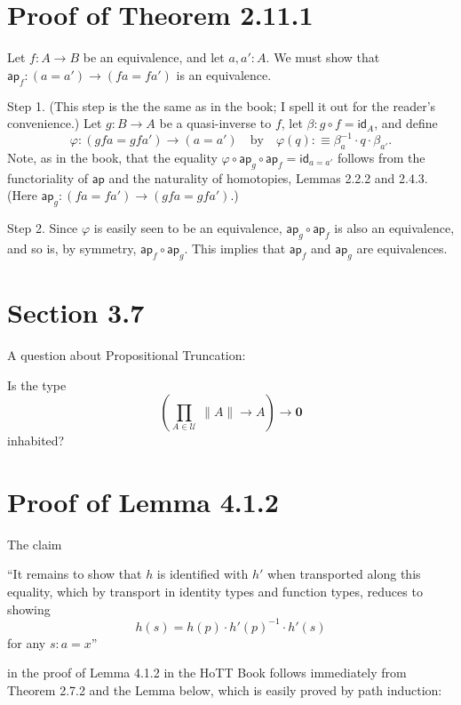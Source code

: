 \documentclass[12pt]{article}
\newcommand{\nn}{\noindent}
\newcommand{\ap}{\mathsf{ap}}
\newcommand{\id}{\mathsf{id}}
\begin{document}

\section{Proof of Theorem 2.11.1}

Let $f:A\to B$ be an equivalence, and let $a,a':A$. We must show that $\ap_f:(a=a')\to (fa=fa')$ is an equivalence.

Step 1. (This step is the the same as in the book; I spell it out for the reader's convenience.) Let $g:B\to A$ be a quasi-inverse to $f$, let $\beta:g\circ f=\id_A$, and define 
$$
\varphi:(gfa=gfa')\to(a=a')\quad\text{by}\quad\varphi(q):\equiv\beta_a^{-1}\cdot q\cdot\beta_{a'}.
$$ 
Note, as in the book, that the equality $\varphi\circ\ap_g\circ\ap_f=\id_{a=a'}$ follows from the functoriality of $\ap$ and the naturality of homotopies, Lemmas 2.2.2 and 2.4.3. (Here $\ap_g:(fa=fa')\to (gfa=gfa')$.)

Step 2. Since $\varphi$ is easily seen to be an equivalence, $\ap_g\circ\ap_f$ is also an equivalence, and so is, by symmetry, $\ap_f\circ\ap_g$. This implies that $\ap_f$ and $\ap_g$ are equivalences.



\section{Section 3.7}

A question about Propositional Truncation:

Is the type 
$$
\left(\prod_{A\in\mathcal U}\ \lVert A\rVert\to A\right)\to\mathbf0
$$ 
inhabited?


\section{Proof of Lemma 4.1.2}

The claim

\nn ``It remains to show that $h$ is identified with $h'$ when transported along this equality, which by transport in identity types and function types, reduces to showing 
$$
h(s)=h(p)\cdot h'(p)^{-1}\cdot h'(s)
$$ 
for any $s:a=x$''

\nn in the proof of Lemma 4.1.2 in the HoTT Book follows immediately from Theorem 2.7.2 and the Lemma below, which is easily proved by path induction:
\end{document}
